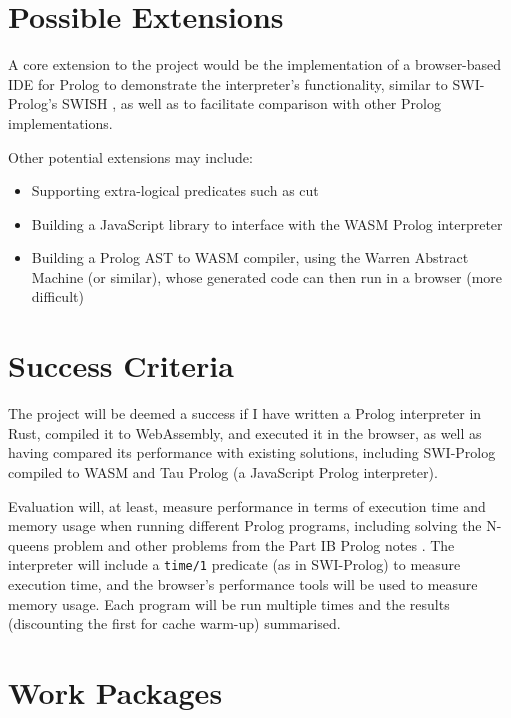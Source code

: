 \documentclass{article}
\begin{document}
\section*{Possible Extensions}

A core extension to the project would be the implementation of a browser-based IDE for Prolog to demonstrate the interpreter's functionality, similar to SWI-Prolog's SWISH \cite{swish}, as well as to facilitate comparison with other Prolog implementations.

Other potential extensions may include:

\begin{itemize}
\item Supporting extra-logical predicates such as cut
\item Building a JavaScript library to interface with the WASM Prolog interpreter
\item Building a Prolog AST to WASM compiler, using the Warren Abstract Machine \cite{wam} (or similar), whose generated code can then run in a browser (more difficult)
\end{itemize}

\section*{Success Criteria}

The project will be deemed a success if I have written a Prolog interpreter in Rust, compiled it to WebAssembly, and executed it in the browser, as well as having compared its performance with existing solutions, including SWI-Prolog compiled to WASM and Tau Prolog \cite{tauprolog} (a JavaScript Prolog interpreter).

Evaluation will, at least, measure performance in terms of execution time and memory usage when running different Prolog programs, including solving the N-queens problem and other problems from the Part IB Prolog notes \cite{prolognotes}. The interpreter will include a \texttt{time/1} predicate (as in SWI-Prolog) to measure execution time, and the browser's performance tools will be used to measure memory usage. Each program will be run multiple times and the results (discounting the first for cache warm-up) summarised.

\section*{Work Packages}
\end{document}
